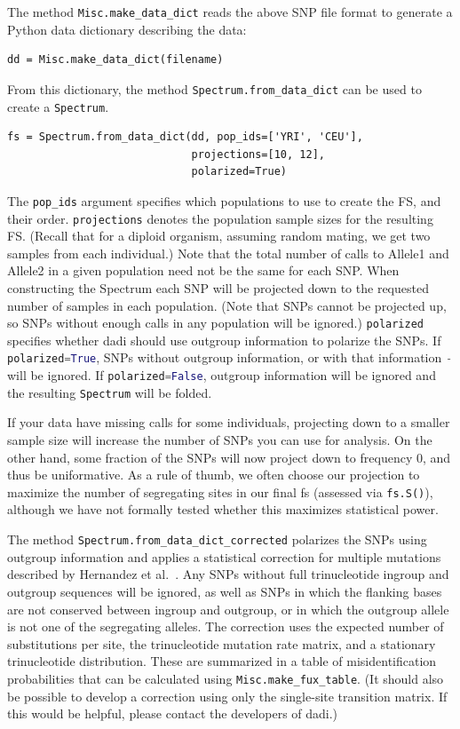\documentclass[12pt]{article}
\makeatletter
\newcommand{\dadi}{dadi\xspace}
\newcommand{\py}[1]{\lstinline[language=Python, showstringspaces=False]@#1@}
\makeatother
\begin{document}
The method \py{Misc.make_data_dict} reads the above SNP file format to generate a Python data dictionary describing the data:
\begin{lstlisting}
dd = Misc.make_data_dict(filename)
\end{lstlisting}
From this dictionary, the method \py{Spectrum.from_data_dict} can be used to create a \py{Spectrum}.
\begin{lstlisting}
fs = Spectrum.from_data_dict(dd, pop_ids=['YRI', 'CEU'],
                             projections=[10, 12],
                             polarized=True)
\end{lstlisting}
The \py{pop_ids} argument specifies which populations to use to create the FS, and their order.
\py{projections} denotes the population sample sizes for the resulting FS.
(Recall that for a diploid organism, assuming random mating, we get two samples from each individual.)
Note that the total number of calls to Allele1 and Allele2 in a given population need not be the same for each SNP.
When constructing the Spectrum each SNP will be projected down to the requested number of samples in each population.
(Note that SNPs cannot be projected up, so SNPs without enough calls in any population will be ignored.)
\py{polarized} specifies whether \dadi should use outgroup information to polarize the SNPs.
If \py{polarized=True}, SNPs without outgroup information, or with that information \py{-} will be ignored.
If \py{polarized=False}, outgroup information will be ignored and the resulting \py{Spectrum} will be folded.

If your data have missing calls for some individuals, projecting down to a smaller sample size will increase the number of SNPs you can use for analysis.
On the other hand, some fraction of the SNPs will now project down to frequency 0, and thus be uniformative.
As a rule of thumb, we often choose our projection to maximize the number of segregating sites in our final fs (assessed via \py{fs.S()}), although we have not formally tested whether this maximizes statistical power.

The method \py{Spectrum.from_data_dict_corrected} polarizes the SNPs using outgroup information and applies a statistical correction for multiple mutations described by Hernandez et al.~\cite{bib:Hernandez2007}.
Any SNPs without full trinucleotide ingroup and outgroup sequences will be ignored, as well as SNPs in which the flanking bases are not conserved between ingroup and outgroup, or in which the outgroup allele is not one of the segregating alleles.
The correction uses the expected number of substitutions per site, the trinucleotide mutation rate matrix, and a stationary trinucleotide distribution.
These are summarized in a table of misidentification probabilities that can be calculated using \py{Misc.make_fux_table}.
(It should also be possible to develop a correction using only the single-site transition matrix.
If this would be helpful, please contact the developers of \dadi.)
\end{document}

